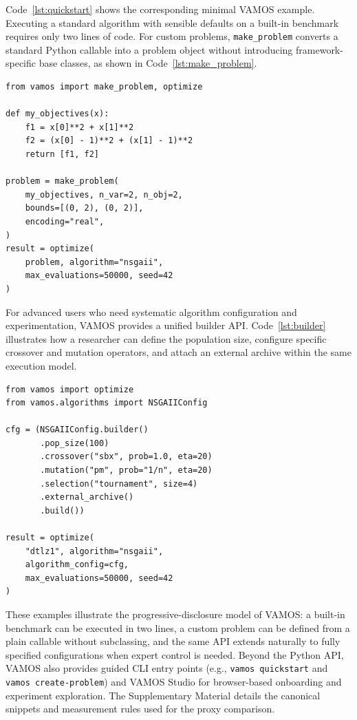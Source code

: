\documentclass[journal]{IEEEtran}
\newcommand{\VAMOS}{VAMOS}
\begin{document}
Code~\ref{lst:quickstart} shows the corresponding minimal \VAMOS{} example. Executing a standard algorithm with sensible defaults on a built-in benchmark requires only two lines of code. For custom problems, \texttt{make\_problem} converts a standard Python callable into a problem object without introducing framework-specific base classes, as shown in Code~\ref{lst:make_problem}.
\begin{lstlisting}[float=!ht,caption={Defining and optimizing a custom MOP in \VAMOS{}.},label={lst:make_problem}]
from vamos import make_problem, optimize

def my_objectives(x):
    f1 = x[0]**2 + x[1]**2
    f2 = (x[0] - 1)**2 + (x[1] - 1)**2
    return [f1, f2]

problem = make_problem(
    my_objectives, n_var=2, n_obj=2, 
    bounds=[(0, 2), (0, 2)],
    encoding="real",
)
result = optimize(
    problem, algorithm="nsgaii", 
    max_evaluations=50000, seed=42
)
\end{lstlisting}

For advanced users who need systematic algorithm configuration and experimentation, \VAMOS{} provides a unified builder API. Code~\ref{lst:builder} illustrates how a researcher can define the population size, configure specific crossover and mutation operators, and attach an external archive within the same execution model.

\begin{lstlisting}[float=tbp,caption={Using the builder API for fine-grained configuration in \VAMOS{}.},label={lst:builder}]
from vamos import optimize
from vamos.algorithms import NSGAIIConfig

cfg = (NSGAIIConfig.builder()
       .pop_size(100)
       .crossover("sbx", prob=1.0, eta=20)
       .mutation("pm", prob="1/n", eta=20)
       .selection("tournament", size=4)
       .external_archive()
       .build())

result = optimize(
    "dtlz1", algorithm="nsgaii", 
    algorithm_config=cfg, 
    max_evaluations=50000, seed=42
)
\end{lstlisting}

These examples illustrate the progressive-disclosure model of \VAMOS{}: a built-in benchmark can be executed in two lines, a custom problem can be defined from a plain callable without subclassing, and the same API extends naturally to fully specified configurations when expert control is needed. Beyond the Python API, \VAMOS{} also provides guided CLI entry points (e.g., \texttt{vamos quickstart} and \texttt{vamos create-problem}) and VAMOS Studio for browser-based onboarding and experiment exploration. The Supplementary Material details the canonical snippets and measurement rules used for the proxy comparison.
\end{document}
